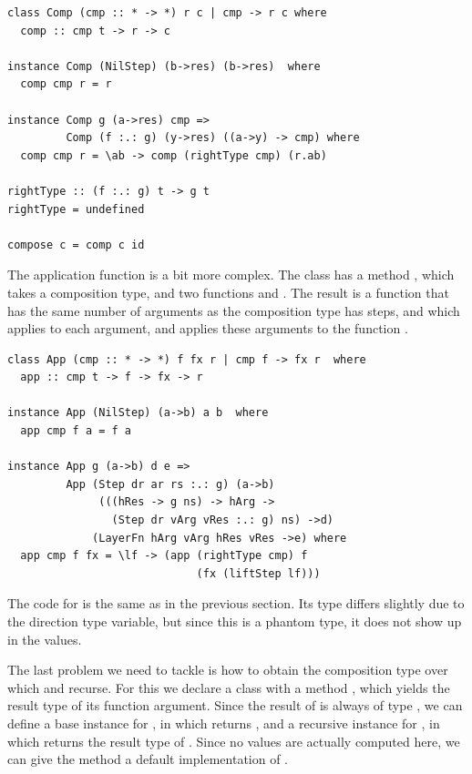 \documentclass[preprint,natbib]{sigplanconf}
\begin{document}
\begin{small}
\begin{verbatim}
class Comp (cmp :: * -> *) r c | cmp -> r c where
  comp :: cmp t -> r -> c

instance Comp (NilStep) (b->res) (b->res)  where
  comp cmp r = r  

instance Comp g (a->res) cmp =>
         Comp (f :.: g) (y->res) ((a->y) -> cmp) where
  comp cmp r = \ab -> comp (rightType cmp) (r.ab)

rightType :: (f :.: g) t -> g t
rightType = undefined

compose c = comp c id
\end{verbatim}
\end{small}

The application function is a bit more complex. The class  has a method , which takes a composition type, and two functions  and . The result is a function that has the same number of arguments as the composition type has steps, and which applies  to each argument, and applies these arguments to the function .

\begin{small}
\begin{verbatim}
class App (cmp :: * -> *) f fx r | cmp f -> fx r  where
  app :: cmp t -> f -> fx -> r

instance App (NilStep) (a->b) a b  where
  app cmp f a = f a

instance App g (a->b) d e =>
         App (Step dr ar rs :.: g) (a->b) 
              (((hRes -> g ns) -> hArg -> 
                (Step dr vArg vRes :.: g) ns) ->d) 
             (LayerFn hArg vArg hRes vRes ->e) where
  app cmp f fx = \lf -> (app (rightType cmp) f
                             (fx (liftStep lf))) 
\end{verbatim}
\end{small}

The code for  is the same as in the previous section. Its type differs slightly due to the direction type variable, but since this is a phantom type, it does not show up in the values. 

The last problem we need to tackle is how to obtain the composition type over which  and  recurse. For this we declare a class  with a method , which yields the result type of its function argument. Since the result of  is always of type , we can define a base instance for , in which  returns , and a recursive instance for , in which  returns the result type of . Since no values are actually computed here, we can give the method a default implementation of .
\end{document}
